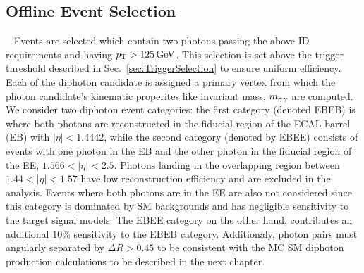 \subsection{Offline Event Selection}~\label{sec:OfflineEvtSel}
Events are selected which contain two photons passing the above ID requirements and having $p_{\mathrm{T}} > 125\,\text{Ge\hspace{-.08em}V}$. This \pt selection is set above the trigger threshold described in Sec.~\ref{sec:TriggerSelection} to ensure uniform efficiency. Each of the diphoton candidate is assigned a primary vertex from which the photon candidate's kinematic properites like invariant mass, $m_{\gamma\gamma}$ are computed.
We consider two diphoton event categories: the first category (denoted EBEB) is where both photons are reconstructed in the fiducial region of the ECAL barrel (EB) with $|\eta| < 1.4442$, while the second category (denoted by EBEE) consists of events with one photon in the EB and the other photon in the fiducial region of the EE, $1.566 < |\eta| < 2.5$. Photons landing in the overlapping region between $1.44 < |\eta| < 1.57$ have low reconstruction efficiency and are excluded in the analysis. Events where both photons are in the EE are also not considered since this category is dominated by SM backgrounds and has negligible sensitivity to the target signal models. The EBEE category on the other hand, contributes an additional 10\% sensitivity to the EBEB category. Additionaly, photon pairs must angularly separated by $\Delta R> 0.45$ to be consistent with the MC SM diphoton production calculations to be described in the next chapter.



